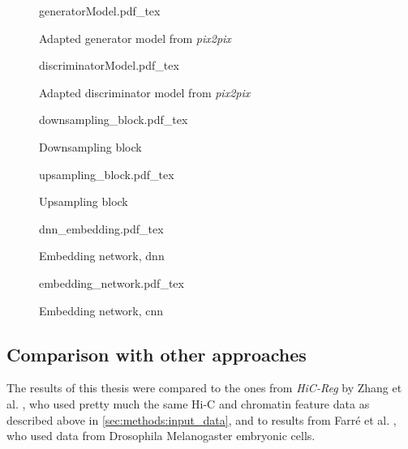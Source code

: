  \begin{figure}[p] %
    \tiny
    {generatorModel.pdf_tex}
    \caption{Adapted generator model from \emph{pix2pix}} \label{fig:methods:GAN_arch:generator}
\end{figure}
\begin{figure}[p] %
    \scriptsize
    \centering
    {discriminatorModel.pdf_tex}
    \caption{Adapted discriminator model from \emph{pix2pix}} \label{fig:methods:GAN_arch:discriminator}
\end{figure}
\begin{figure}[p]%
    \scriptsize
    \centering
    {downsampling_block.pdf_tex}
    \caption{Downsampling block} \label{fig:methods:GAN_arch:downsampling}
\end{figure}
\begin{figure}[p] %
    \scriptsize
    \centering
    {upsampling_block.pdf_tex}
    \caption{Upsampling block} \label{fig:methods:GAN_arch:upsampling}
\end{figure}
\begin{figure}[p] %
    \scriptsize
    \centering
    {dnn_embedding.pdf_tex}
    \caption{Embedding network, \acrshort{dnn}} \label{fig:methods:dnn-embedding}
\end{figure}
\begin{figure}[p] %
    \scriptsize
    \centering
    {embedding_network.pdf_tex}
    \caption{Embedding network, \acrshort{cnn}} \label{fig:methods:GAN_arch:embedding_network}
\end{figure}
 
\clearpage

 
\subsection{Comparison with other approaches} \label{sec:methods:comparison}
The results of this thesis were compared to the ones from \emph{HiC-Reg} by Zhang et al. \cite{Zhang2019}, 
who used pretty much the same Hi-C and chromatin feature data
as described above in \cref{sec:methods:input_data}, 
and to results from Farr\'e et al. \cite{Farre2018a}, who used data from Drosophila Melanogaster embryonic cells.


